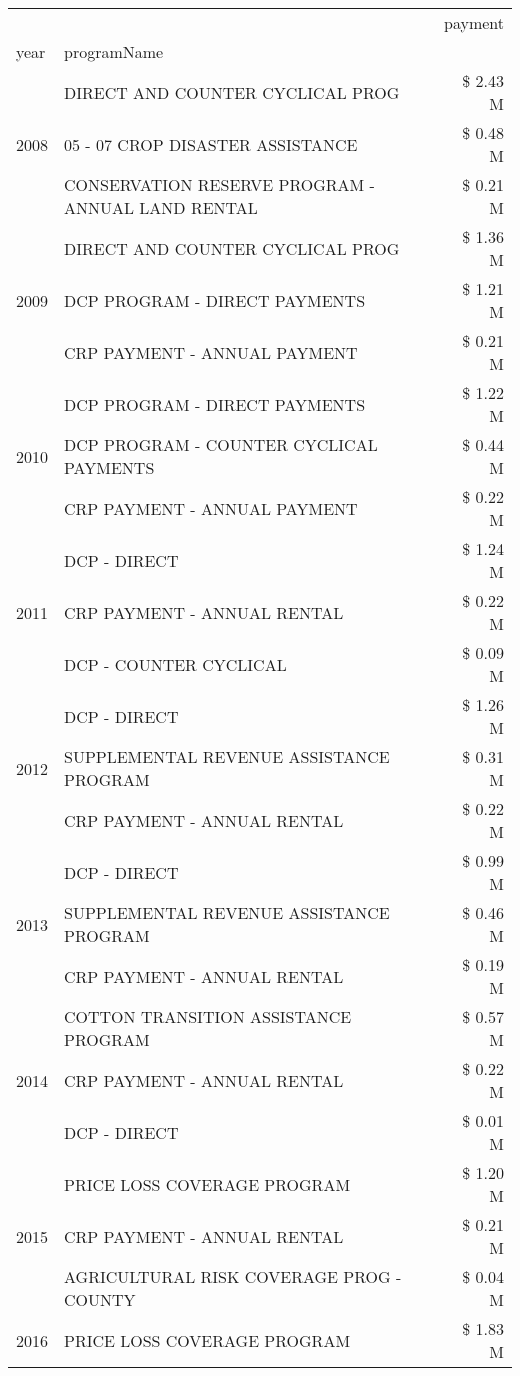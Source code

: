 \begin{tabular}{llr}
\toprule
 &  & payment \\
year & programName &  \\
\midrule
\multirow[t]{3}{*}{2008} & DIRECT AND COUNTER CYCLICAL PROG & \$ 2.43 M \\
 & 05 - 07 CROP DISASTER ASSISTANCE & \$ 0.48 M \\
 & CONSERVATION RESERVE PROGRAM - ANNUAL LAND RENTAL & \$ 0.21 M \\
\cline{1-3}
\multirow[t]{3}{*}{2009} & DIRECT AND COUNTER CYCLICAL PROG & \$ 1.36 M \\
 & DCP PROGRAM - DIRECT PAYMENTS & \$ 1.21 M \\
 & CRP PAYMENT - ANNUAL PAYMENT & \$ 0.21 M \\
\cline{1-3}
\multirow[t]{3}{*}{2010} & DCP PROGRAM - DIRECT PAYMENTS & \$ 1.22 M \\
 & DCP PROGRAM - COUNTER CYCLICAL PAYMENTS & \$ 0.44 M \\
 & CRP PAYMENT - ANNUAL PAYMENT & \$ 0.22 M \\
\cline{1-3}
\multirow[t]{3}{*}{2011} & DCP - DIRECT & \$ 1.24 M \\
 & CRP PAYMENT - ANNUAL RENTAL & \$ 0.22 M \\
 & DCP - COUNTER CYCLICAL & \$ 0.09 M \\
\cline{1-3}
\multirow[t]{3}{*}{2012} & DCP - DIRECT & \$ 1.26 M \\
 & SUPPLEMENTAL REVENUE ASSISTANCE PROGRAM & \$ 0.31 M \\
 & CRP PAYMENT - ANNUAL RENTAL & \$ 0.22 M \\
\cline{1-3}
\multirow[t]{3}{*}{2013} & DCP - DIRECT & \$ 0.99 M \\
 & SUPPLEMENTAL REVENUE ASSISTANCE PROGRAM & \$ 0.46 M \\
 & CRP PAYMENT - ANNUAL RENTAL & \$ 0.19 M \\
\cline{1-3}
\multirow[t]{3}{*}{2014} & COTTON TRANSITION ASSISTANCE PROGRAM & \$ 0.57 M \\
 & CRP PAYMENT - ANNUAL RENTAL & \$ 0.22 M \\
 & DCP - DIRECT & \$ 0.01 M \\
\cline{1-3}
\multirow[t]{3}{*}{2015} & PRICE LOSS COVERAGE PROGRAM & \$ 1.20 M \\
 & CRP PAYMENT - ANNUAL RENTAL & \$ 0.21 M \\
 & AGRICULTURAL RISK COVERAGE PROG - COUNTY & \$ 0.04 M \\
\cline{1-3}
\multirow[t]{3}{*}{2016} & PRICE LOSS COVERAGE PROGRAM & \$ 1.83 M \\

\end{tabular}
